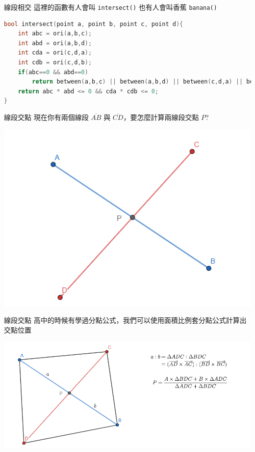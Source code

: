 \documentclass[aspectratio=169]{beamer}
\begin{document}
\begin{frame}[fragile]{線段相交}
    這裡的函數有人會叫 \texttt{intersect()} 也有人會叫香蕉 \texttt{banana()}
    \begin{lstlisting}[language=C++,basicstyle=\ttfamily\small]
bool intersect(point a, point b, point c, point d){
    int abc = ori(a,b,c);
    int abd = ori(a,b,d);
    int cda = ori(c,d,a);
    int cdb = ori(c,d,b);
    if(abc==0 && abd==0) 
        return between(a,b,c) || between(a,b,d) || between(c,d,a) || between(c,d,b);
    return abc * abd <= 0 && cda * cdb <= 0;
}
    \end{lstlisting}
\end{frame}

\begin{frame}[fragile]{線段交點}
    現在你有兩個線段 $\overline{AB}$ 與 $\overline{CD}$，要怎麼計算兩線段交點 $P$?
    \begin{center}
        \includegraphics[scale=0.5]{images/intersect_point.png}
    \end{center}
\end{frame}

\begin{frame}[fragile]{線段交點}
    高中的時候有學過分點公式，我們可以使用面積比例套分點公式計算出交點位置
    \begin{center}
        \includegraphics[scale=0.5]{images/intersect_point_2.png}
    \end{center}
\end{frame}
\end{document}
